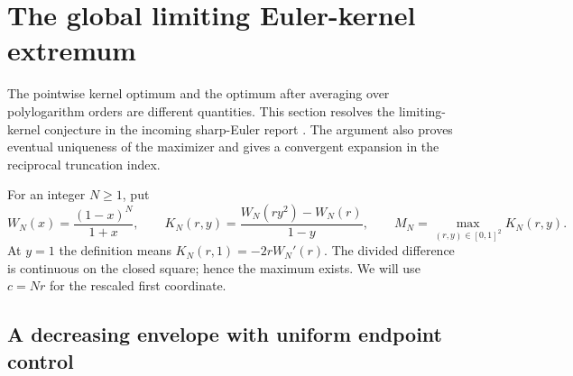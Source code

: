 \section{The global limiting Euler-kernel extremum}
\label{sec:kernel-extrema}

The pointwise kernel optimum and the optimum after averaging over
polylogarithm orders are different quantities. This section resolves the
limiting-kernel conjecture in the incoming sharp-Euler report
\cite{SharpEulerIncoming}. The argument also proves eventual uniqueness
of the maximizer and gives a convergent expansion in the reciprocal
truncation index.

For an integer $N\ge1$, put
\begin{equation}\label{eq:kernel-def}
 W_N(x)=\frac{(1-x)^N}{1+x},\qquad
 K_N(r,y)=\frac{W_N(ry^2)-W_N(r)}{1-y},\qquad
 M_N=\max_{(r,y)\in[0,1]^2}K_N(r,y).
\end{equation}
At $y=1$ the definition means $K_N(r,1)=-2rW_N'(r)$.
The divided difference is continuous on the closed square; hence the
maximum exists. We will use $c=Nr$ for the rescaled first coordinate.

\subsection{A decreasing envelope with uniform endpoint control}

